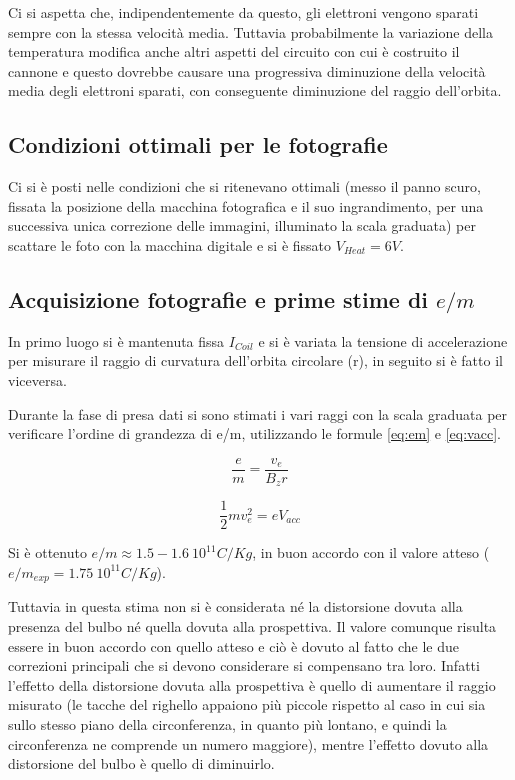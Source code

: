 \documentclass[10pt,a4paper]{article}
\begin{document}
Ci si aspetta che, indipendentemente da questo, gli elettroni vengono sparati sempre con la stessa velocità media. Tuttavia probabilmente la variazione della temperatura modifica anche altri aspetti del circuito con cui è costruito il cannone e questo dovrebbe causare una progressiva diminuzione della velocità media degli elettroni sparati, con conseguente diminuzione del raggio dell'orbita.


\subsection{Condizioni ottimali per le fotografie}

Ci si è posti nelle condizioni che si ritenevano ottimali (messo il panno scuro, fissata la posizione della macchina fotografica e il suo ingrandimento, per una successiva unica correzione delle immagini, illuminato la scala graduata) per scattare le foto con la macchina digitale e si è fissato $V_{Heat} = \unit{6}{V}$.


\subsection{Acquisizione fotografie e prime stime di $e/m$}

In primo luogo si è mantenuta fissa $I_{Coil}$ e si è variata la tensione di accelerazione per misurare il raggio di curvatura dell'orbita circolare (r), in seguito si è fatto il viceversa.

Durante la fase di presa dati si sono stimati i vari raggi con la scala graduata per verificare l'ordine di grandezza di e/m, utilizzando le formule \eqref{eq:em} e \eqref{eq:vacc}. 

\begin{equation}
	\frac{e}{m} = \frac{v_e}{B_z r}
	\label{eq:em}
\end{equation}

\begin{equation}
\frac{1}{2} m v_e^2 = e V_{acc}
\label{eq:vacc}
\end{equation}

Si è ottenuto  $e/m \approx \unit{1.5-1.6~10^{11}}{C/Kg}$, in buon accordo con il valore atteso ($e/m_{exp} = \unit{1.75~10^{11}}{C/Kg}$).

Tuttavia in questa stima non si è considerata né la distorsione dovuta alla presenza del bulbo né quella dovuta alla prospettiva. Il valore comunque risulta essere in buon accordo con quello atteso e ciò è dovuto al fatto che le due correzioni principali che si devono considerare si compensano tra loro. Infatti l'effetto della distorsione dovuta alla prospettiva è quello di aumentare il raggio misurato (le tacche del righello appaiono più piccole rispetto al caso in cui sia sullo stesso piano della circonferenza, in quanto più lontano, e quindi la circonferenza ne comprende un numero maggiore), mentre l'effetto dovuto alla distorsione del bulbo è quello di diminuirlo.
\end{document}
